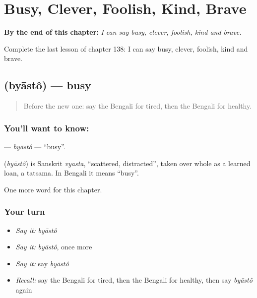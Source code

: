 
\chapter{Busy, Clever, Foolish, Kind, Brave}
\label{ch:bn-busy-clever-foolish-kind-brave}

\begin{chapteropening}
\textbf{By the end of this chapter:} \emph{I can say busy, clever, foolish, kind and brave.}

Complete the last lesson of chapter 138: I can say busy, clever, foolish, kind and brave.
\end{chapteropening}

\section[\texorpdfstring{\bn{ব্যস্ত} (byāstô)}{ব্যস্ত (byāstô)}]{ (byāstô) — busy}

\label{lesson:BN-C138-byasto}



\begin{quote}
Before the new one: say the Bengali for tired, then the Bengali for healthy.
\end{quote}

\subsection*{You'll want to know: }
\textbf{} — \emph{byāstô} — \textquotedblleft{}busy\textquotedblright{}.

\begin{cousinweb}
\textbf{} (\emph{byāstô}) is Sanskrit \emph{vyasta}, \textquotedblleft{}scattered, distracted\textquotedblright{}, taken over whole as a learned loan, a tatsama. In Bengali it means \textquotedblleft{}busy\textquotedblright{}.
\end{cousinweb}

\begin{grammarlens}[title={What you've built}]
One more word for this chapter.
\end{grammarlens}

\subsection*{Your turn}
\begin{itemize}
\raggedright
  \item \emph{Say it:} \emph{byāstô}
  \item \emph{Say it:} \emph{byāstô}, once more
  \item \emph{Say it:} say \emph{byāstô}
  \item \emph{Recall:} say the Bengali for tired, then the Bengali for healthy, then say \emph{byāstô} again
\end{itemize}

